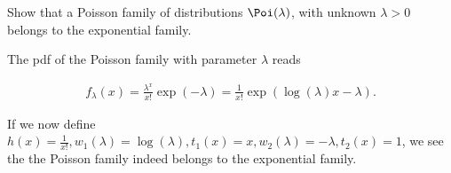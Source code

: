 
\begin{exercise}

Show that a Poisson family of distributions $\Poi(\lambda)$, with unknown
$\lambda > 0$ belongs to the exponential family.
    
\end{exercise}
    
    
\begin{solution}
    
The pdf of the Poisson family with parameter $\lambda$ reads

\begin{align*}
    f_\lambda(x) = \frac{\lambda^x}{x!}\exp(-\lambda)
    =  \frac{1}{x!}\exp(\log(\lambda)x-\lambda).
\end{align*}

If we now define $h(x) = \frac{1}{x!}, w_1(\lambda) = \log(\lambda), 
t_1(x) = x, w_2(\lambda) = - \lambda, t_2(x) = 1$,
we see the the Poisson family indeed belongs to the exponential family.
    
\end{solution}
    
    